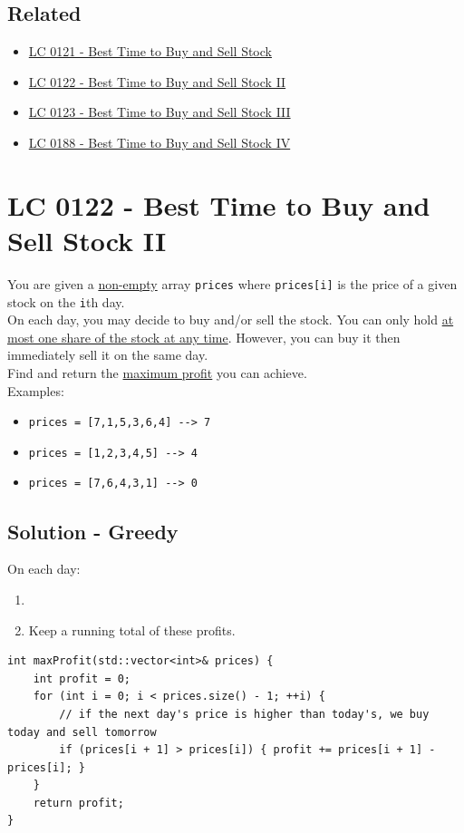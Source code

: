 \subsection*{Related}
\begin{itemize}
	\item \hyperref[lc0121]{LC 0121 - Best Time to Buy and Sell Stock}
	\item \hyperref[lc0122]{LC 0122 - Best Time to Buy and Sell Stock II}
	\item \hyperref[lc0123]{LC 0123 - Best Time to Buy and Sell Stock III}
	\item \hyperref[lc0188]{LC 0188 - Best Time to Buy and Sell Stock IV}
\end{itemize}

\section{LC 0122 - Best Time to Buy and Sell Stock II}\label{lc0122}
You are given a \ul{non-empty} array {\colorbox{CodeBackground}{\lstinline|prices|}} where {\colorbox{CodeBackground}{\lstinline|prices[i]|}} is the price of a given stock on the {\colorbox{CodeBackground}{\lstinline|i|}}th day.\\

On each day, you may decide to buy and/or sell the stock. You can only hold \ul{at most one share of the stock at any time}. However, you can buy it then immediately sell it on the same day.\\

Find and return the \ul{maximum profit} you can achieve.\\

Examples:
\begin{itemize}
	\item {\colorbox{CodeBackground}{\lstinline|prices = [7,1,5,3,6,4] --> 7|}}
	\item {\colorbox{CodeBackground}{\lstinline|prices = [1,2,3,4,5] --> 4|}}
	\item {\colorbox{CodeBackground}{\lstinline|prices = [7,6,4,3,1] --> 0|}}
\end{itemize}

\subsection*{Solution - Greedy}\label{solution:lc0122_greedy}
On each day:
\begin{enumerate}
\item {\color{magenta}{Whenever you find a chance to make a profit (the price tomorrow is higher than the price today), buy today and sell tomorrow.}}
\item Keep a running total of these profits.
\end{enumerate}
\begin{lstlisting}
int maxProfit(std::vector<int>& prices) {
	int profit = 0;
	for (int i = 0; i < prices.size() - 1; ++i) {
		// if the next day's price is higher than today's, we buy today and sell tomorrow
		if (prices[i + 1] > prices[i]) { profit += prices[i + 1] - prices[i]; }
	}
	return profit;
}
\end{lstlisting}


